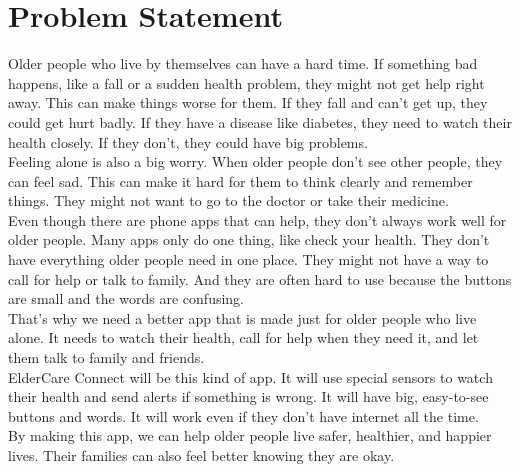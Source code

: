 \section{Problem Statement}
Older people who live by themselves can have a hard time. If something bad happens, like a fall or a sudden health problem, they might not get help right away. This can make things worse for them. If they fall and can't get up, they could get hurt badly. If they have a disease like diabetes, they need to watch their health closely. If they don't, they could have big problems.\\
Feeling alone is also a big worry. When older people don't see other people, they can feel sad. This can make it hard for them to think clearly and remember things. They might not want to go to the doctor or take their medicine.\\
Even though there are phone apps that can help, they don't always work well for older people. Many apps only do one thing, like check your health. They don't have everything older people need in one place. They might not have a way to call for help or talk to family. And they are often hard to use because the buttons are small and the words are confusing.\\
That's why we need a better app that is made just for older people who live alone. It needs to watch their health, call for help when they need it, and let them talk to family and friends.\\
ElderCare Connect will be this kind of app. It will use special sensors to watch their health and send alerts if something is wrong. It will have big, easy-to-see buttons and words. It will work even if they don't have internet all the time.\\
By making this app, we can help older people live safer, healthier, and happier lives. Their families can also feel better knowing they are okay.

